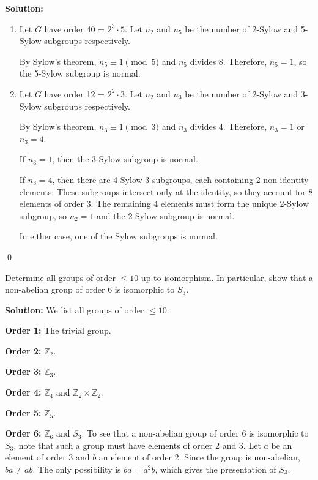 \noindent\textbf{Solution:}
\begin{enumerate}[label=(\alph*)]
\item Let $G$ have order 40 = $2^3 \cdot 5$. Let $n_2$ and $n_5$ be the number of 2-Sylow and 5-Sylow subgroups respectively.

By Sylow's theorem, $n_5 \equiv 1 \pmod{5}$ and $n_5$ divides 8. Therefore, $n_5 = 1$, so the 5-Sylow subgroup is normal.

\item Let $G$ have order 12 = $2^2 \cdot 3$. Let $n_2$ and $n_3$ be the number of 2-Sylow and 3-Sylow subgroups respectively.

By Sylow's theorem, $n_3 \equiv 1 \pmod{3}$ and $n_3$ divides 4. Therefore, $n_3 = 1$ or $n_3 = 4$.

If $n_3 = 1$, then the 3-Sylow subgroup is normal.

If $n_3 = 4$, then there are 4 Sylow 3-subgroups, each containing 2 non-identity elements. These subgroups intersect only at the identity, so they account for 8 elements of order 3. The remaining 4 elements must form the unique 2-Sylow subgroup, so $n_2 = 1$ and the 2-Sylow subgroup is normal.

In either case, one of the Sylow subgroups is normal.
\end{enumerate}


\qed
\begin{problembox}
Determine all groups of order $\leq 10$ up to isomorphism. In particular, show that a non-abelian group of order 6 is isomorphic to $S_3$.
\end{problembox}

\noindent\textbf{Solution:} We list all groups of order $\leq 10$:

\textbf{Order 1:} The trivial group.

\textbf{Order 2:} $\mathbb{Z}_2$.

\textbf{Order 3:} $\mathbb{Z}_3$.

\textbf{Order 4:} $\mathbb{Z}_4$ and $\mathbb{Z}_2 \times \mathbb{Z}_2$.

\textbf{Order 5:} $\mathbb{Z}_5$.

\textbf{Order 6:} $\mathbb{Z}_6$ and $S_3$. To see that a non-abelian group of order 6 is isomorphic to $S_3$, note that such a group must have elements of order 2 and 3. Let $a$ be an element of order 3 and $b$ an element of order 2. Since the group is non-abelian, $ba \neq ab$. The only possibility is $ba = a^2b$, which gives the presentation of $S_3$.

